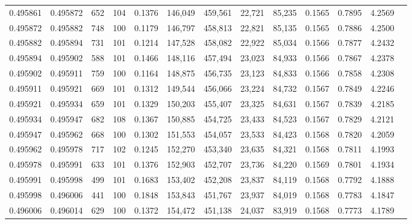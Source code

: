\begin{tabular}{rrrrrrrrrrrrr}
0.495861 & 0.495872 &   652 & 104 &                                     0.1376 & 146,049 & 459,561 &  22,721 &  85,235 & 0.1565 & 0.7895 & 4.2569 \\
0.495872 & 0.495882 &   748 & 100 &                                     0.1179 & 146,797 & 458,813 &  22,821 &  85,135 & 0.1565 & 0.7886 & 4.2500 \\
0.495882 & 0.495894 &   731 & 101 &                                     0.1214 & 147,528 & 458,082 &  22,922 &  85,034 & 0.1566 & 0.7877 & 4.2432 \\
0.495894 & 0.495902 &   588 & 101 &                                     0.1466 & 148,116 & 457,494 &  23,023 &  84,933 & 0.1566 & 0.7867 & 4.2378 \\
0.495902 & 0.495911 &   759 & 100 &                                     0.1164 & 148,875 & 456,735 &  23,123 &  84,833 & 0.1566 & 0.7858 & 4.2308 \\
0.495911 & 0.495921 &   669 & 101 &                                     0.1312 & 149,544 & 456,066 &  23,224 &  84,732 & 0.1567 & 0.7849 & 4.2246 \\
0.495921 & 0.495934 &   659 & 101 &                                     0.1329 & 150,203 & 455,407 &  23,325 &  84,631 & 0.1567 & 0.7839 & 4.2185 \\
0.495934 & 0.495947 &   682 & 108 &                                     0.1367 & 150,885 & 454,725 &  23,433 &  84,523 & 0.1567 & 0.7829 & 4.2121 \\
0.495947 & 0.495962 &   668 & 100 &                                     0.1302 & 151,553 & 454,057 &  23,533 &  84,423 & 0.1568 & 0.7820 & 4.2059 \\
0.495962 & 0.495978 &   717 & 102 &                                     0.1245 & 152,270 & 453,340 &  23,635 &  84,321 & 0.1568 & 0.7811 & 4.1993 \\
0.495978 & 0.495991 &   633 & 101 &                                     0.1376 & 152,903 & 452,707 &  23,736 &  84,220 & 0.1569 & 0.7801 & 4.1934 \\
0.495991 & 0.495998 &   499 & 101 &                                     0.1683 & 153,402 & 452,208 &  23,837 &  84,119 & 0.1568 & 0.7792 & 4.1888 \\
0.495998 & 0.496006 &   441 & 100 &                                     0.1848 & 153,843 & 451,767 &  23,937 &  84,019 & 0.1568 & 0.7783 & 4.1847 \\
0.496006 & 0.496014 &   629 & 100 &                                     0.1372 & 154,472 & 451,138 &  24,037 &  83,919 & 0.1568 & 0.7773 & 4.1789 \\

\end{tabular}
